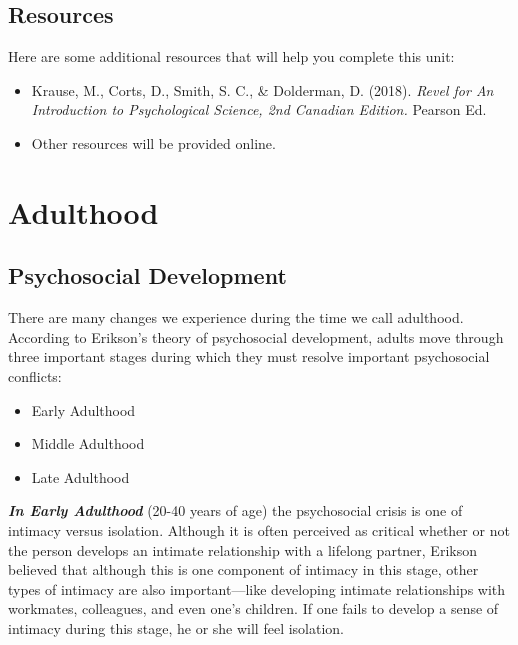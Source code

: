\documentclass[
]{book}
\providecommand{\tightlist}{%
  \setlength{\itemsep}{0pt}\setlength{\parskip}{0pt}}
\begin{document}
\hypertarget{resources-1}{%
\subsection*{Resources}\label{resources-1}}

Here are some additional resources that will help you complete this unit:

\begin{itemize}
\tightlist
\item
  Krause, M., Corts, D., Smith, S. C., \& Dolderman, D. (2018). \emph{Revel for An Introduction to Psychological Science, 2nd Canadian Edition.} Pearson Ed.
\item
  Other resources will be provided online.
\end{itemize}

\hypertarget{adulthood}{%
\section{Adulthood}\label{adulthood}}

\hypertarget{psychosocial-development}{%
\subsection*{Psychosocial Development}\label{psychosocial-development}}

There are many changes we experience during the time we call adulthood. According to Erikson's theory of psychosocial development, adults move through three important stages during which they must resolve important psychosocial conflicts:

\begin{itemize}
\tightlist
\item
  Early Adulthood\\
\item
  Middle Adulthood\\
\item
  Late Adulthood
\end{itemize}

\textbf{\emph{In Early Adulthood}} (20-40 years of age) the psychosocial crisis is one of intimacy versus isolation. Although it is often perceived as critical whether or not the person develops an intimate relationship with a lifelong partner, Erikson believed that although this is one component of intimacy in this stage, other types of intimacy are also important---like developing intimate relationships with workmates, colleagues, and even one's children. If one fails to develop a sense of intimacy during this stage, he or she will feel isolation.
\end{document}
